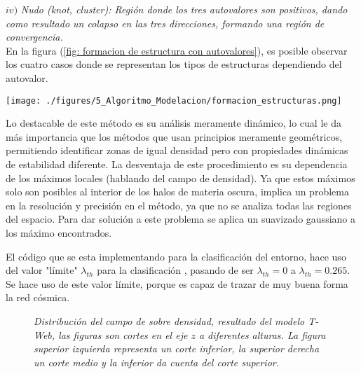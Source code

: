 $iv)$ {\it{Nudo (knot, cluster)}: Región donde los tres autovalores son positivos, dando como resultado un colapso en las tres direcciones, formando una región de convergencia.}\\

En la figura (\ref{fig: formacion de estructura con autovalores}), es posible observar los cuatro casos donde se representan los tipos de estructuras dependiendo del autovalor.
%
\begin{center}
\texttt{[image: ./figures/5\_Algoritmo\_Modelacion/formacion\_estructuras.png]}
\label{fig: formacion de estructura con autovalores}
\end{center}
%
Lo destacable de este método es su análisis meramente dinámico, lo cual le da más importancia que los métodos que usan principios meramente geométricos, permitiendo identificar zonas de igual densidad pero con propiedades dinámicas de estabilidad diferente. La desventaja de este procedimiento es su dependencia de los máximos locales (hablando del campo de densidad). 
Ya que estos máximos solo son posibles al interior de los halos de materia oscura, implica un problema en la resolución y precisión en el método, ya que no se analiza todas las regiones del espacio. Para
dar solución a este problema se aplica un suavizado gaussiano a los máximo encontrados.


El código que se esta implementando para la clasificación del entorno, hace uso del valor "límite" $\lambda_{th}$ para la clasificación \cite{bustamante2015}, pasando de ser $\lambda_{th}=0$ a $\lambda_{th}=0.265$. Se hace uso de este valor límite, porque es capaz de trazar de muy buena forma la red cósmica. 

\begin{figure} 
\centering 
{} 
\caption{\emph{Distribución del campo de sobre densidad, resultado del modelo T-Web, las figuras son cortes en el eje $z$ a diferentes alturas. La figura superior izquierda representa un corte inferior, la superior derecha un corte medio  y la inferior da cuenta del corte superior.}} 
\label{fig: Campo de densidad } 
\end{figure}




